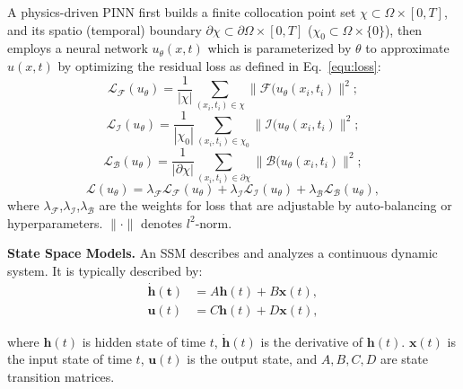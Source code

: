 \documentclass{article}
\theoremstyle{plain}
\theoremstyle{definition}
\theoremstyle{remark}
\begin{document}
A physics-driven PINN first builds a finite collocation point set $\chi \subset \Omega\times[0,T]$, and its spatio (temporal) boundary $\partial\chi \subset \partial\Omega\times[0,T]$ ($\chi_0 \subset \Omega\times\{0\}$), then employs a neural network $u_\theta(x,t)$ which is parameterized by $\theta$ to approximate $u(x,t)$ by optimizing the residual loss as defined in Eq.~\ref{equ:loss}:
\vspace{-2mm}
\begin{equation}
    \mathcal L_{\mathcal F}(u_\theta)= \frac{1}{|\chi|}\sum_{(x_i,t_i)\in \chi}\|\mathcal F(u_\theta(x_i,t_i)\|^2;
    \label{equ:lossequ}
\end{equation}
\begin{equation}
    \mathcal L_{\mathcal I}(u_\theta)= \frac{1}{|\chi_0|}\sum_{(x_i,t_i)\in \chi_0}\|\mathcal I(u_\theta(x_i,t_i)\|^2;
    \label{equ:lossinit}
\end{equation}
\begin{equation}
    \mathcal L_{\mathcal B}(u_\theta)= \frac{1}{|\partial\chi|}\sum_{(x_i,t_i)\in \partial\chi}\|\mathcal B(u_\theta(x_i,t_i)\|^2;
    \label{equ:lossbound}
\end{equation}
\begin{equation}
    \mathcal L(u_\theta)=\lambda_{\mathcal F}\mathcal L_{\mathcal F}(u_\theta)+\lambda_{\mathcal I}\mathcal L_{\mathcal I}(u_\theta)+\lambda_{\mathcal B}\mathcal L_{\mathcal B}(u_\theta),
    \label{equ:loss}
\end{equation}
where $\lambda_\mathcal F$,$\lambda_\mathcal I$,$\lambda_\mathcal B$ are the weights for loss that are adjustable by auto-balancing or hyperparameters. $\|\cdot\|$ denotes $l^2$-norm.


\textbf{State Space Models.} An SSM describes and analyzes a continuous dynamic system. It is typically described by:
\begin{align}    \label{equ:hiddenssm}
   \mathbf {\dot h(t)} &= A\mathbf h(t) + B\mathbf x(t),\\
     \mathbf u(t) &= C\mathbf h(t) + D\mathbf x(t),
     \label{equ:outputssm}
\end{align}

where $\mathbf h(t)$ is hidden state of time $t$, $\mathbf {\dot  h}(t)$ is the derivative of $\mathbf h(t)$. $\mathbf x(t)$ is the input state of time $t$, $\mathbf u(t)$ is the output state, and $A,B,C,D$ are state transition matrices. 
    
\end{document}

